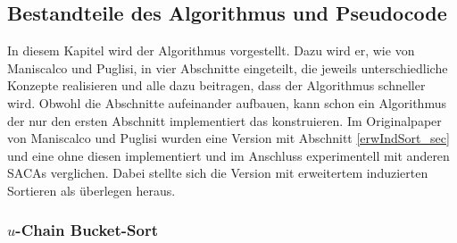 \subsection{Bestandteile des Algorithmus und Pseudocode} \label{mainPart}
In diesem Kapitel wird der Algorithmus vorgestellt. Dazu wird er, wie von Maniscalco und Puglisi, in vier Abschnitte eingeteilt, die jeweils unterschiedliche Konzepte realisieren und alle dazu beitragen, dass der Algorithmus schneller wird. 
Obwohl die Abschnitte aufeinander aufbauen, kann schon ein Algorithmus der nur den ersten Abschnitt implementiert das \isa konstruieren. Im Originalpaper von Maniscalco und Puglisi wurden eine Version mit Abschnitt \ref{erwIndSort_sec} und eine ohne diesen implementiert und im Anschluss experimentell mit anderen SACAs verglichen. Dabei stellte sich die Version mit erweitertem induzierten Sortieren als überlegen heraus.

\subsubsection{$u$-Chain Bucket-Sort}
\label{4.1}

